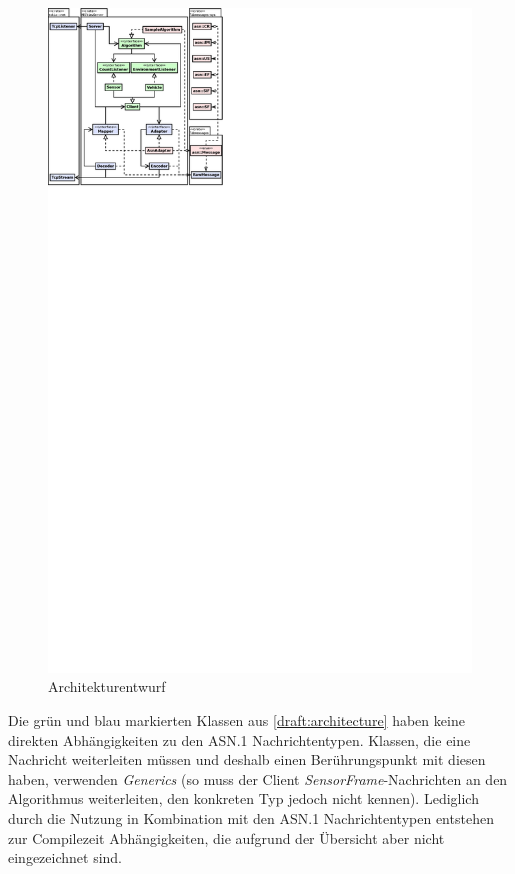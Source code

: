 \begin{figure}[H]
	\centering
	\includegraphics[width=1.9\textwidth]{dia/architecture}
	\caption{Architekturentwurf}
	\label{draft:architecture}
\end{figure}

Die grün und blau markierten Klassen aus \autoref{draft:architecture} haben keine direkten Abhängigkeiten zu den ASN.1 Nachrichtentypen.
Klassen, die eine Nachricht weiterleiten müssen und deshalb einen Berührungspunkt mit diesen haben, verwenden \textit{Generics} (so muss der Client \textit{SensorFrame}-Nachrichten an den Algorithmus weiterleiten, den konkreten Typ jedoch nicht kennen).
Lediglich durch die Nutzung in Kombination mit den ASN.1 Nachrichtentypen entstehen zur Compilezeit Abhängigkeiten, die aufgrund der Übersicht aber nicht eingezeichnet sind.

